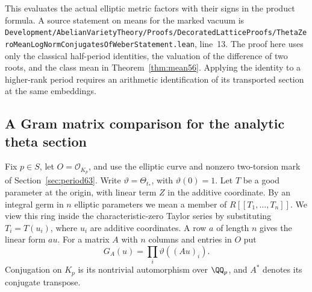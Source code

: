 \documentclass[a4paper,11pt]{article}
\theoremstyle{definition}
\theoremstyle{remark}
\newcommand{\srcloc}[2]{{\small\nolinkurl{#1.lean}}, line~#2}
\numberwithin{equation}{section}
\begin{document}
This evaluates the actual elliptic metric factors with their signs
in the product formula. A source statement on means for the marked
vacuum is
\srcloc{Development/AbelianVarietyTheory/Proofs/DecoratedLatticeProofs/ThetaZeroMeanLogNormConjugatesOfWeberStatement}{13}.
The proof here uses only the classical half-period identities, the
valuation of the difference of two roots, and the class mean in
Theorem~\ref{thm:mean56}. Applying the identity to a higher-rank
period requires an arithmetic identification of its transported
section at the same embeddings.

\subsection{A Gram matrix comparison for the analytic theta section}\label{nav:V-16}
\label{sec:gram66}

Fix \(p\in S\), let \(O=\mathcal O_{K_p}\), and use the elliptic
curve and nonzero two-torsion mark of Section~\ref{sec:period63}.
Write \(\vartheta=\Theta_{t_*}\), with \(\vartheta(0)=1\). Let
\(T\) be a good parameter at the origin, with linear term \(Z\)
in the additive coordinate. By an integral germ in \(n\) elliptic
parameters we mean a member of \(R[[T_1,\ldots,T_n]]\). We view
this ring inside the characteristic-zero Taylor series by substituting
\(T_i=T(u_i)\), where \(u_i\) are additive coordinates.
A row \(a\) of length \(n\) gives the linear form \(a u\).
For a matrix \(A\) with \(n\) columns and entries in \(O\) put
\[
                  G_A(u)=\prod_i\vartheta((Au)_i).
\]
Conjugation on \(K_p\) is its nontrivial automorphism over
\(\QQ_p\), and \(A^*\) denotes its conjugate transpose.
\end{document}
